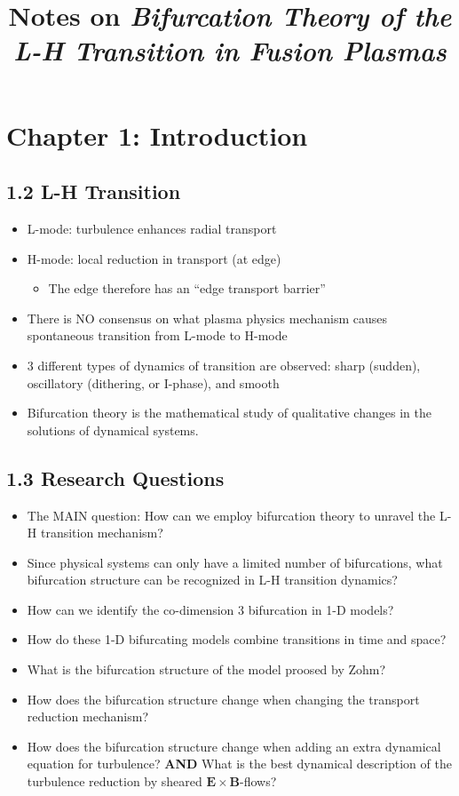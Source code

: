 \documentclass[a4paper]{article}
\title{Notes on \emph{Bifurcation Theory of the L-H Transition in Fusion Plasmas}}
\begin{document}
\maketitle

\section{Chapter 1: Introduction}\label{chapter-1-introduction}

\subsection{1.2 L-H Transition}\label{l-h-transition}

\begin{itemize}
\item
  L-mode: turbulence enhances radial transport
\item
  H-mode: local reduction in transport (at edge)

  \begin{itemize}
  \itemsep1pt\parskip0pt
  \item
    The edge therefore has an ``edge transport barrier''
  \end{itemize}
\item
  There is NO consensus on what plasma physics mechanism causes
  spontaneous transition from L-mode to H-mode
\item
  3 different types of dynamics of transition are observed: sharp
  (sudden), oscillatory (dithering, or I-phase), and smooth
\item
  Bifurcation theory is the mathematical study of qualitative changes in
  the solutions of dynamical systems.
\end{itemize}

\subsection{1.3 Research Questions}\label{research-questions}

\begin{itemize}
\item
  The MAIN question: How can we employ bifurcation theory to unravel the
  L-H transition mechanism?
\item
  Since physical systems can only have a limited number of bifurcations,
  what bifurcation structure can be recognized in L-H transition
  dynamics?
\item
  How can we identify the co-dimension 3 bifurcation in 1-D models?
\item
  How do these 1-D bifurcating models combine transitions in time and
  space?
\item
  What is the bifurcation structure of the model proosed by Zohm?
\item
  How does the bifurcation structure change when changing the transport
  reduction mechanism?
\item
  How does the bifurcation structure change when adding an extra
  dynamical equation for turbulence? \textbf{AND} What is the best
  dynamical description of the turbulence reduction by sheared
  $\mathbf{E}\times\mathbf{B}$-flows?
\end{itemize}
\end{document}
